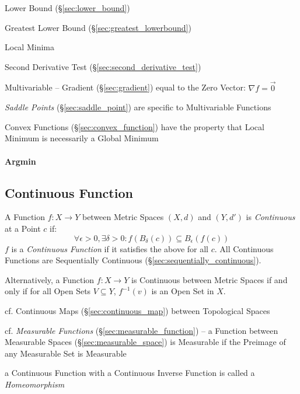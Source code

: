Lower Bound (\S\ref{sec:lower_bound})

Greatest Lower Bound (\S\ref{sec:greatest_lowerbound})

Local Minima

Second Derivative Test (\S\ref{sec:second_derivative_test})

Multivariable -- Gradient (\S\ref{sec:gradient}) equal to the Zero Vector:
$\nabla{f} = \vec{0}$

\fist \emph{Saddle Points} (\S\ref{sec:saddle_point}) are specific to
Multivariable Functions

Convex Functions (\S\ref{sec:convex_function}) have the property that Local
Minimum is necessarily a Global Minimum



\paragraph{Argmin}\label{sec:argmin}\hfill



\subsection{Continuous Function}\label{sec:continuous_function}

A Function $f : X \rightarrow Y$ between Metric Spaces $(X,d)$ and $(Y,d')$ is
\emph{Continuous} at a Point $c$ if:
\[
  \forall \epsilon > 0, \exists \delta > 0 :
  f (B_{\delta}(c)) \subseteq B_{\epsilon}(f(c))
\]
$f$ is a \emph{Continuous Function} if it satisfies the above for all $c$. All
Continuous Functions are Sequentially Continuous
(\S\ref{sec:sequentially_continuous}).

Alternatively, a Function $f: X \rightarrow Y$ is Continuous between Metric
Spaces if and only if for all Open Sets $V \subseteq Y$, $f^{-1}(v)$ is an Open
Set in $X$.

\fist cf. Continuous Maps (\S\ref{sec:continuous_map}) between Topological
Spaces

\fist cf. \emph{Measurable Functions} (\S\ref{sec:measurable_function}) -- a
Function between Measurable Spaces (\S\ref{sec:measurable_space}) is Measurable
if the Preimage of any Measurable Set is Measurable

a Continuous Function with a Continuous Inverse Function is called a
\emph{Homeomorphism}

